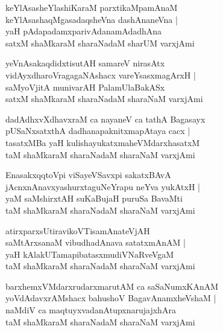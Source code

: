 \begin{shloka}
keYlAsasheYlashiKaraM parxtikaMpamAnaM\\
keYlAsashaqMgasadaqsheVna dashAnaneVna |\\
yaH pAdapadamxparivAdanamAdadhAna \\
satxM shaMkaraM sharaNadaM sharUM varxjAmi
\end{shloka}

\begin{shloka}
yeVnAsakaqdidxtisutAH samareV nirasAtx\\
vidAyxdharoVragagaNAshacx vareYsasxmagArxH |\\
saMyoVjitA munivarAH PalamUlaBakASx\\
satxM shaMkaraM sharaNadaM sharaNaM varxjAmi
\end{shloka}

\begin{shloka}
dadAdhxvXdhavxraM ca nayaneV ca tathA Bagasayx\\
pUSaNxsatxthA dadhanapaknitxmapAtaya cacx |\\
tasatxMBa yaH kulishayukatxmaheVMdarxhasatxM\\
taM shaMkaraM sharaNadaM sharaNaM varxjAmi
\end{shloka}

\begin{shloka}
EnasakxqqtoVpi viSayeVSavxpi sakatxBAvA\\
jAcnxnAnavxyashurxtaguNeYrapu neYva yukAtxH |\\
yaM saMshirxtAH suKaBujaH puruSa BavaMti \\
taM shaMkaraM sharaNadaM sharaNaM varxjAmi
\end{shloka}

\begin{shloka}
atirxparxsUtiravikoVTisamAnateVjAH \\
saMtArxsanaM vibudhadAnava satatxmAnAM |\\
yaH kAlakUTamapibatasxmudiVNaRveVgaM \\
taM shaMkaraM sharaNadaM sharaNaM varxjAmi
\end{shloka}

\begin{shloka}
barxhemxVMdarxrudarxmarutAM ca saSaNumxKAnAM \\
yoVdAdavxrAMshacx bahushoV BagavAnamxheVshaM |\\
naMdiV ca maqtuyxvadanAtupxnarujajxhAra \\
taM shaMkaraM sharaNadaM sharaNaM varxjAmi
\end{shloka}

